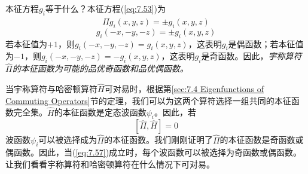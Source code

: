     本征方程$g_i$等于什么？本征方程(\ref{eq:7.53})为
    \begin{equation*}
        \hat{\Pi}g_i\left(x,y,z\right) = \pm g_i\left(x,y,z\right)
    \end{equation*}
    \begin{equation*}
        g_i\left(-x,-y,-z\right) = \pm g_i\left(x,y,z\right)
    \end{equation*}
    若本征值为$+1$，则$g_i\left(-x,-y,-z\right) = g_i\left(x,y,z\right)$，这表明$g_i$是偶函数；若本征值为$-1$，则$g_i\left(-x,-y,-z\right) = -g_i\left(x,y,z\right)$，这表明$g_i$是奇函数。因此，\textit{宇称算符$\hat{\Pi}$的本征函数为可能的品优奇函数和品优偶函数。}

    当宇称算符与哈密顿算符$\hat{H}$可对易时，根据第\ref{sec:7.4 Eigenfunctions of Commuting Operators}节的定理，我们可以为这两个算符选择一组共同的本征函数完全集。$\hat{H}$的本征函数是定态波函数$\psi_i$。因此，若
    \begin{equation}
        \left[\hat{\Pi}, \hat{H}\right] = 0
        \label{eq:7.57}
    \end{equation}
    波函数$\psi_i$可以被选择成为$\hat{\Pi}$的本征函数。我们刚刚证明了$\hat{\Pi}$的本征函数是奇函数或偶函数。因此，当(\ref{eq:7.57})成立时，每个波函数可以被选择为奇函数或偶函数。让我们看看宇称算符和哈密顿算符在什么情况下可对易。


